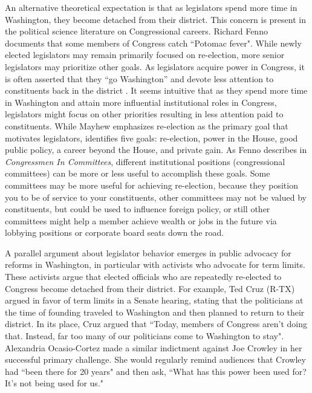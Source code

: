 \documentclass[12pt]{article}
\begin{document}
An alternative theoretical expectation is that as legislators spend more time in Washington, they become detached from their district.  This concern is present in the political science literature on Congressional careers. Richard Fenno documents that some members of Congress catch ``Potomac fever".  While newly elected legislators may remain primarily focused on re-election, more senior legislators may prioritize other goals. As legislators acquire power in Congress, it is often asserted that they ``go Washington'' and devote less attention to constituents back in the district \citep{Fenno1978}.  It seems intuitive that as they spend more time in Washington and attain more influential institutional roles in Congress, legislators might focus on other priorities resulting in less attention paid to constituents.   While Mayhew emphasizes re-election as the primary goal that motivates legislators, \citet{Fenno1973} identifies five goals: re-election, power in the House, good public policy, a career beyond the House, and private gain.  As Fenno describes in \textit{Congressmen In Committees}, different institutional positions (congressional committees) can be more or less useful to accomplish these goals.  Some committees may be more useful for achieving re-election, because they position you to be of service to your constituents, other committees may not be valued by constituents, but could be used to influence foreign policy, or still other committees might help a member achieve wealth or jobs in the future via lobbying positions or corporate board seats down the road.     

A parallel argument about legislator behavior emerges in public advocacy for reforms in Washington, in particular with activists who advocate for term limits.  These activists argue that elected officials who are repeatedly re-elected to Congress become detached from their district.  For example, Ted Cruz (R-TX) argued in favor of term limits in a Senate hearing, stating that the politicians at the time of founding traveled to Washington and then planned to return to their district.  In its place, Cruz argued that ``Today, members of Congress aren't doing that. Instead, far too many of our politicians come to Washington to stay".  Alexandria Ocasio-Cortez made a similar indictment against Joe Crowley in her successful primary challenge.  She would regularly remind audiences that Crowley had ``been there for 20 years" and then ask, ``What has this power been used for? It's not being used for us."  %
\end{document}
